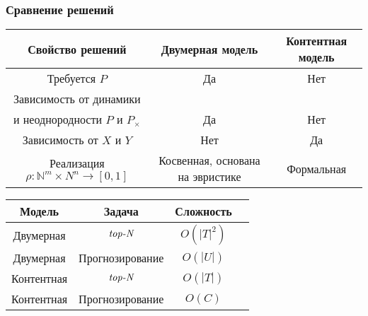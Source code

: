\documentclass[10pt,xcolor={usenames,dvipsnames}]{beamer}
\theoremstyle{break}
\def\top{\text{{\it top-N}}}
\begin{document}
\begin{frame}
  \frametitle{Сравнение решений}
	\scriptsize{
\begin{table}[h]
		  \begin{center}
			\begin{tabular}{|c|c|c|}
			  \hline
			  Свойство решений & Двумерная модель & Контентная модель   \\ \hline
				Требуется $P$  & Да & Нет   \\ \hline
				Зависимость от динамики  & & \\ и неоднородности $P$ и $P_{\times}$  & Да & Нет   \\ \hline
				Зависимость от $X$ и $Y$  & Нет & Да   \\ \hline
				Реализация $\rho: \mathbb{N}^m \times N^{n} \rightarrow [0,1]$
				& Косвенная, основана на эвристике & Формальная \\ \hline
			\end{tabular}
		  \end{center}
		\end{table}
 \begin{center}
	\begin{table}[h]
	  \begin{tabular}{|c|c|c|c|}
		\hline
		Модель & Задача & Сложность  \\ \hline
		Двумерная & $\top$ & $O(|T|^2)$  \\ \hline
		Двумерная & Прогнозирование & $O(|U|)$ \\ \hline
		Контентная & $\top$ & $O(|T|)$ \\ \hline
		Контентная & Прогнозирование & $O(C)$ \\ \hline
	  \end{tabular}
	\end{table}
	\end{center}
}
\end{frame}
\end{document}

